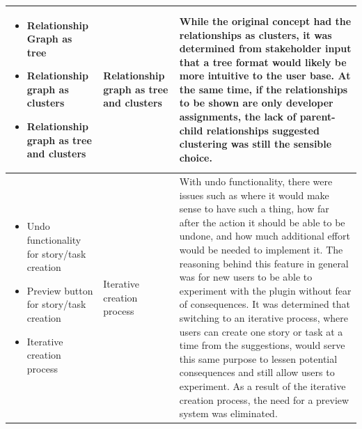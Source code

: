 \begin{table}[!h]
\begin{tabularx}{\textwidth}{|p{3cm}|p{3cm}|X|}
	\hline
	\begin{itemize}
		\item Relationship Graph as tree
		\item Relationship graph as clusters
		\item Relationship graph as tree and clusters
	\end{itemize} & 
	Relationship graph as tree and clusters & While the original concept had the relationships as clusters, it was determined from stakeholder input that a tree format would likely be more intuitive to the user base. At the same time, if the relationships to be shown are only developer assignments, the lack of parent-child relationships suggested clustering was still the sensible choice.\\
	\hline
	\begin{itemize}
		\item Undo functionality for story/task creation
		\item Preview button for story/task creation
		\item Iterative creation process
	\end{itemize} & 
	Iterative creation process & With undo functionality, there were issues such as where it would make sense to have such a thing, how far after the action it should be able to be undone, and how much additional effort would be needed to implement it. The reasoning behind this feature in general was for new users to be able to experiment with the plugin without fear of consequences. It was determined that switching to an iterative process, where users can create one story or task at a time from the suggestions, would serve this same purpose to lessen potential consequences and still allow users to experiment. As a result of the iterative creation process, the need for a preview system was eliminated.\\
	\hline
	\end{tabularx}
\label{tab:UIUXDesignChoices}
\end{table}
